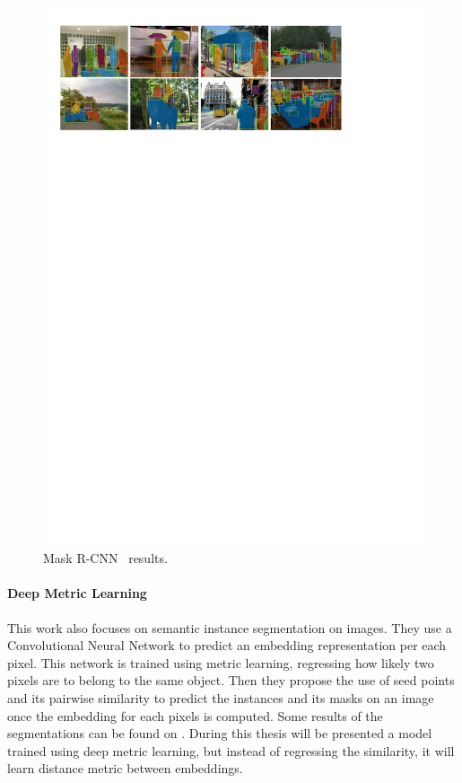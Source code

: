 \begin{figure}[h]
  \centering
  \includegraphics[width=1.\linewidth]{figures/maskrcnn/results.pdf}
  \caption{Mask R-CNN~\cite{he2017mask} results. }
  \label{fig:maskrcnn}
\end{figure}

\paragraph{Deep Metric Learning~\deepml}
This work also focuses on semantic instance segmentation on images.
They use a Convolutional Neural Network to predict an embedding representation per each pixel.
This network is trained using metric learning, regressing how likely two pixels are to belong to the same object.
Then they propose the use of seed points and its pairwise similarity to predict the instances and its masks on an image once the embedding for each pixels is computed.
Some results of the segmentations can be found on .
During this thesis will be presented a model trained using deep metric learning, but instead of regressing the similarity, it will learn distance metric between embeddings.

